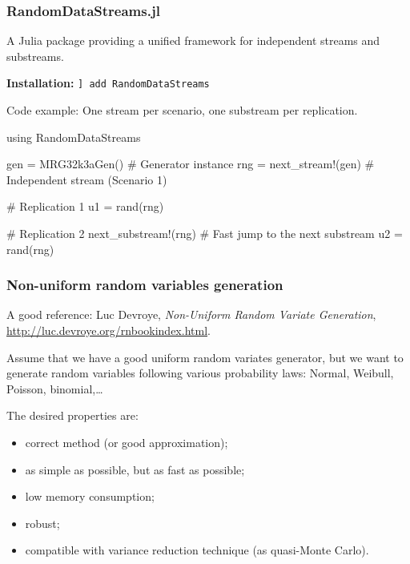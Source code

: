 \documentclass[aspectratio=169]{beamer}
\def\blue{\color{blue}}
\begin{document}
	\begin{frame}[fragile]
	\frametitle{RandomDataStreams.jl}

	A Julia package providing a unified framework for independent streams and substreams.
	
	\vspace{0.15cm}
	\textbf{Installation:} \texttt{] add RandomDataStreams}

	\vspace{0.2cm}
	{\blue Code example:} One stream per scenario, one substream per replication.
	
	\begin{footnotesize}
	\begin{semiverbatim}
using RandomDataStreams

gen = MRG32k3aGen()     # Generator instance
rng = next_stream!(gen) # Independent stream (Scenario 1)

# Replication 1
u1 = rand(rng)

# Replication 2
next_substream!(rng)    # Fast jump to the next substream
u2 = rand(rng)
	\end{semiverbatim}
	\end{footnotesize}

	\end{frame}

	\begin{frame}
		\frametitle{Non-uniform random variables generation}
		\label{chap:nonuniform}
		
		A good reference: Luc Devroye, \textsl{Non-Uniform
			Random Variate Generation},
		\url{http://luc.devroye.org/rnbookindex.html}.
		
		\mbox{}
		
		Assume that we have a good uniform random variates generator, but we
		want to generate random variables following various probability laws:
		Normal, Weibull, Poisson, binomial,\ldots
		
		\mbox{}
		
		The desired properties are:
		\begin{itemize}
			\item
			correct method (or good approximation);
			\item
			as simple as possible, but as fast as possible;
			\item
			low memory consumption;
			\item
			robust;
			\item
			compatible with variance reduction technique (as quasi-Monte Carlo).
		\end{itemize}
		
	\end{frame}
	
\end{document}
